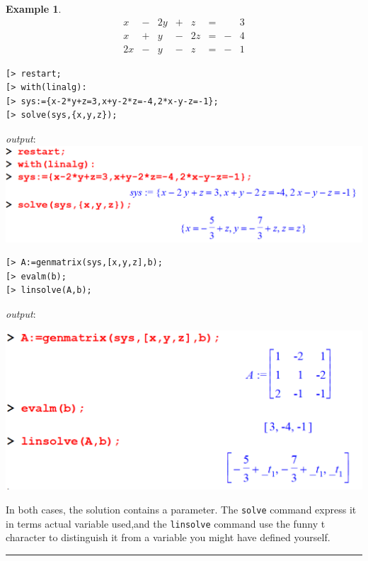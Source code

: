 \documentclass[
]{book}
\theoremstyle{definition}
\theoremstyle{definition}
\newtheorem{example}{Example}[chapter]
\theoremstyle{definition}
\theoremstyle{definition}
\theoremstyle{remark}
\begin{document}
\begin{example}
\protect\hypertarget{exm:unnamed-chunk-19}{}\label{exm:unnamed-chunk-19}\[
\begin{array}{ccccccccc}
x &-& 2y&+& z &=& &3\\
x &+& y &-& 2z&=&-&4\\
2x&-& y &-& z &=&-&1  
\end{array}
\]
\end{example}

\begin{verbatim}
[> restart;
[> with(linalg):
[> sys:={x-2*y+z=3,x+y-2*z=-4,2*x-y-z=-1};
[> solve(sys,{x,y,z});
\end{verbatim}

\emph{output}:
\includegraphics{figures/Lesson 5/fig9.png}

\begin{verbatim}
[> A:=genmatrix(sys,[x,y,z],b);
[> evalm(b);
[> linsolve(A,b);
\end{verbatim}

\emph{output}:

\includegraphics{figures/Lesson 5/fig10.png}

In both cases, the solution contains a parameter.
The \texttt{solve} command express it in terms actual variable used,and the \texttt{linsolve} command use the funny t character to distinguish it from a variable you might have defined yourself.

\begin{center}\rule{0.5\linewidth}{0.5pt}\end{center}
\end{document}
